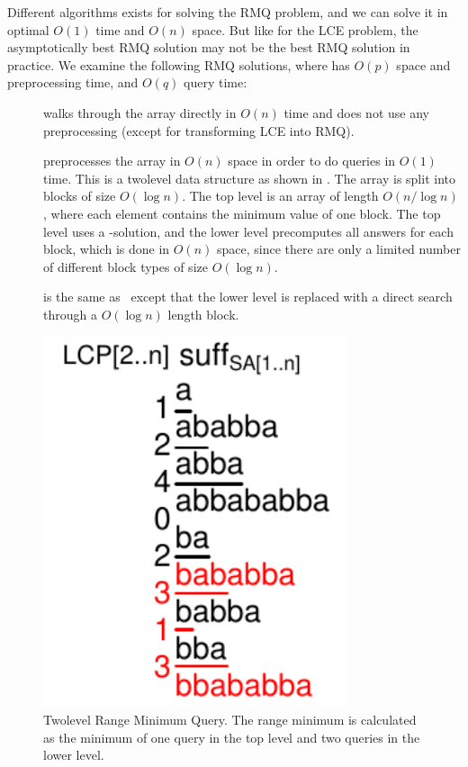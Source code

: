 \documentclass[a4]{article}
\newcommand*{\pref}{\prettyref}
\begin{document}
Different algorithms exists for solving the RMQ problem, and we can solve it in optimal $O(1)$ time and $O(n)$ space. But like for the LCE problem, the asymptotically best RMQ solution may not be the best RMQ solution in practice. We examine the following RMQ solutions, where  has $O(p)$ space and preprocessing time, and $O(q)$ query time:
\begin{samepage}
\begin{description}
\item[\RMQn] walks through the array directly in $O(n)$ time and does not use any preprocessing (except for transforming LCE into RMQ).
\item[\RMQq] preprocesses the array in $O(n)$ space in order to do queries in $O(1)$ time. This is a twolevel data structure as shown in \pref{fig:sa+lcp+min-twolevel}. The array is split into blocks of size $O(\log n)$. The top level is an array of length $O(n/\log n)$, where each element contains the minimum value of one block. The top level uses a -solution, and the lower level precomputes all answers for each block, which is done in $O(n)$ space, since there are only a limited number of different block types of size $O(\log n)$.
\item[\RMQlog] is the same as \RMQq\ except that the lower level is replaced with a direct search through a $O(\log n)$ length block.
\end{description}
\end{samepage}

\begin{figure}[tp]
    \begin{center}
        \includegraphics[width=0.8\textwidth,page=2]{sa+lcp+min.pdf}
    \end{center}
    \caption{\label{fig:sa+lcp+min-twolevel}Twolevel Range Minimum Query. The range minimum is calculated as the minimum of one query in the top level and two queries in the lower level.}
\end{figure}
\end{document}
